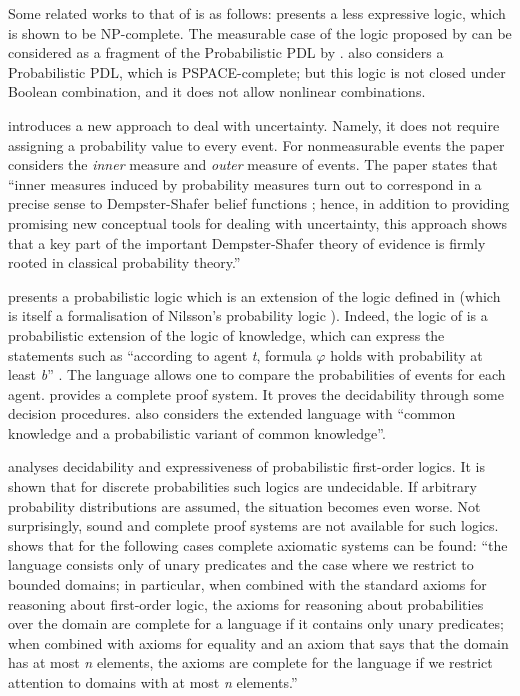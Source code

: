\documentclass[11pt]{article}
\begin{document}
Some related works to that of \cite{FHM90} is as follows: \cite{GKP88} presents a less expressive logic, which is shown to be NP-complete. The measurable case of the logic proposed by \cite{FHM90} can be considered as a fragment of the Probabilistic PDL by \cite{Fel84}. \cite{Koz83} also considers a Probabilistic PDL, which is PSPACE-complete; but this logic is not closed under Boolean combination, and it does not allow nonlinear combinations.

\cite{FH91} introduces a new approach to deal with uncertainty. Namely, it does not require assigning a probability value to every event. For nonmeasurable events the paper considers the \emph{inner} measure and \emph{outer} measure of events. The paper states that  ``inner measures induced by probability measures turn out to correspond in a precise sense to Dempster-Shafer belief functions \cite{Sha76}; hence, in addition to providing promising new conceptual tools for dealing with uncertainty, this approach shows that a key part of the important Dempster-Shafer theory of evidence is firmly rooted in classical probability theory.''

\cite{FH94} presents a probabilistic logic which is an extension of the logic defined in \cite{FHM90} (which is itself a formalisation of Nilsson's probability logic \cite{Nil86}). Indeed, the logic of \cite{FH94} is a probabilistic extension of the logic of knowledge, which can express the statements  such as ``according to agent \emph{t}, formula $\varphi$ holds with probability at least \emph{b}'' \cite{FHM90}. The language allows one to compare the probabilities of events for each agent. \cite{FH94} provides a complete proof system. It proves the decidability through some decision procedures. \cite{FH94} also considers the extended language with ``common knowledge and a probabilistic variant of common knowledge''.

 \cite{AH94} analyses decidability and expressiveness of probabilistic first-order logics. It is shown that for discrete probabilities such logics are undecidable.  If arbitrary probability distributions are assumed, the situation becomes even worse. Not surprisingly, sound and complete proof systems are not available for such logics. \cite{AH94} shows that for the following cases complete axiomatic systems can be found: ``the language consists only of unary predicates and the case where we restrict to bounded domains; in particular, when combined with the standard axioms for reasoning about first-order logic, the axioms for reasoning about probabilities over the domain are complete for a language if it contains only unary predicates; when combined with axioms for equality and an axiom that says that the domain has at most \emph{n} elements, the axioms are complete for the language if we restrict attention to domains with at most \emph{n} elements.''
\end{document}
